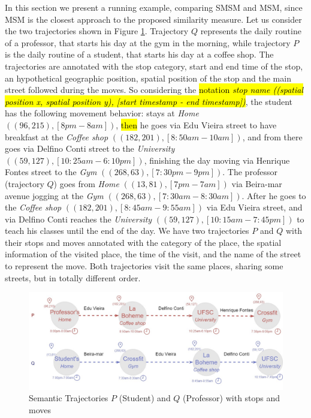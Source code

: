\documentclass[12pt]{article}
\begin{document}
In this section we present a running example, comparing SMSM and MSM, since MSM is the closest approach to the proposed similarity measure.
Let us consider the two trajectories shown in Figure \ref{fig:bus}. Trajectory $Q$ represents the daily routine of a professor, that starts his day at the gym in the morning, while trajectory $P$ is the daily routine of a student, that starts his day at a coffee shop. The trajectories are annotated with the stop category, start and end time of the stop, an hypothetical geographic position, spatial position of the stop and the main street followed during the moves. So considering the \hl{notation \textit{stop name ((spatial position x, spatial position y), [start timestamp - end timestamp])}}, the student has the following movement behavior: stays at \textit{Home} $((96,215), [8pm-8am])$, \hl{then} he goes via Edu Vieira street to have breakfast at the \textit{Coffee shop} $((182,201), [8:50am-10am])$, and from there goes via Delfino Conti street to the \textit{University} $((59,127), [10:25am-6:10pm])$, finishing the day moving via Henrique Fontes street to the \textit{Gym} $((268,63), [7:30pm-9pm])$. The professor (trajectory $Q$) goes from \textit{Home} $((13,81), [7pm-7am])$ via Beira-mar avenue jogging at the \textit{Gym} $((268,63), [7:30am-8:30am])$. After he goes to the \textit{Coffee shop} $((182,201), [8:45am-9:55am])$ via Edu Vieira street, and via Delfino Conti reaches the \textit{University} $((59,127), [10:15am-7:45pm])$ to teach his classes until the end of the day. We have two trajectories $P$ and $Q$ with their stops and moves annotated with the category of the place, the spatial information of the visited place, the time of the visit, and the name of the street to represent the move. Both trajectories visit the same places, sharing some streets, but in totally different order.
\begin{figure}[h!]
\centering
\includegraphics[width=1\textwidth]{Images/running_example.jpg}
\caption{\label{fig:bus} Semantic Trajectories $P$ (Student) and $Q$ (Professor) with stops and moves}
\end{figure}
\end{document}
